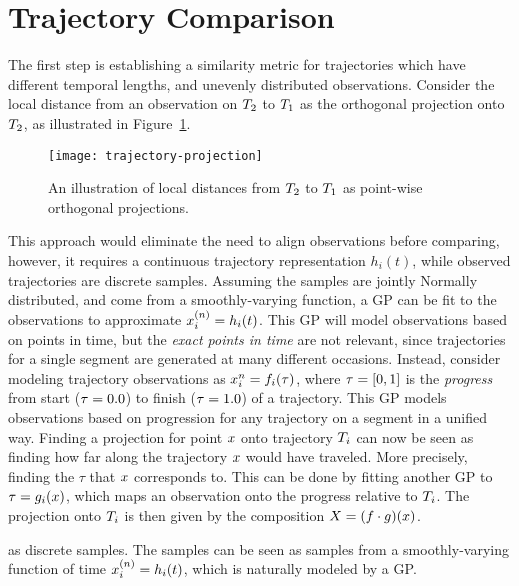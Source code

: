 \section{Trajectory Comparison}
The first step is establishing a similarity metric for
trajectories which have different temporal lengths, and unevenly
distributed observations. Consider the local distance
from an observation on $T_2$ to $T_1$ as the orthogonal
projection onto $T_2$, as illustrated in Figure~\ref{fig:trajectory-projection}.
\begin{figure}
  \centering
  \texttt{[image: trajectory-projection]}
  \caption{An illustration of local distances from $T_2$ to
  $T_1$ as point-wise orthogonal projections.}\label{fig:trajectory-projection}
\end{figure}
This approach would eliminate the need to align observations before
comparing, however, it requires a continuous trajectory representation $h_{i}(t)$,
while observed trajectories are discrete samples. Assuming the samples
are jointly Normally distributed, and
come from a smoothly-varying function, a GP can be fit to the
observations to approximate $x_{i}^{(n)} = h_{i}(t)$. This GP will
model observations based on points in time, but the
\textit{exact points in time} are not relevant, since trajectories
for a single segment are generated at many different
occasions. Instead, consider modeling trajectory observations 
as $x_{i}^{n} = f_{i}(\tau)$, where
$\tau = [0, 1]$ is the \textit{progress} from
start ($\tau = 0.0$) to finish ($\tau = 1.0$) of
a trajectory. This GP models observations based on
progression for any trajectory on a segment in a unified way. 
Finding a projection for point $x$ onto trajectory
$T_{i}$ can now be seen as finding how far along the trajectory $x$
would have traveled. More precisely, finding the $\tau$ that $x$
corresponds to. This can be done by fitting another GP to
$\tau = g_{i}(x)$, which maps an observation onto the
progress relative to $T_{i}$. The projection onto $T_{i}$ is
then given by the composition $X = (f \cdot g)(x)$.


as discrete samples. The samples can be seen as samples from a
smoothly-varying function of time $x_{i}^{(n)} = h_{i}(t)$, which
is naturally modeled by a GP.


